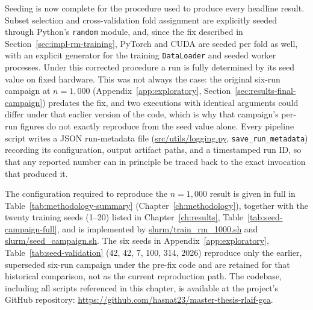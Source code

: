Seeding is now complete for the procedure used to produce every headline
result. Subset selection and cross-validation fold assignment are explicitly
seeded through Python's \texttt{random} module, and, since the fix described
in Section~\ref{sec:impl-rm-training}, PyTorch and CUDA are seeded per fold as
well, with an explicit generator for the training \texttt{DataLoader} and
seeded worker processes. Under this corrected procedure a run is fully
determined by its seed value on fixed hardware. This was not always the case:
the original six-run campaign at $n=1{,}000$
(Appendix~\ref{app:exploratory}, Section~\ref{sec:results-final-campaign}) predates
the fix, and two executions with identical arguments could differ under that
earlier version of the code, which is why that campaign's per-run figures do
not exactly reproduce from the seed value alone. Every pipeline script writes
a JSON run-metadata file
(\url{src/utils/logging.py}, \texttt{save\_run\_metadata}) recording its
configuration, output artifact paths, and a timestamped run ID, so that any
reported number can in principle be traced back to the exact invocation that
produced it.

The configuration required to reproduce the $n=1{,}000$ result is given in full
in Table~\ref{tab:methodology-summary} (Chapter~\ref{ch:methodology}), together
with the twenty training seeds (1--20) listed in Chapter~\ref{ch:results},
Table~\ref{tab:seed-campaign-full}, and is implemented by
\url{slurm/train_rm_1000.sh} and \url{slurm/seed_campaign.sh}. The six seeds
in Appendix~\ref{app:exploratory}, Table~\ref{tab:seed-validation}
(42, 42, 7, 100, 314, 2026) reproduce only
the earlier, superseded six-run campaign under the pre-fix code and are
retained for that historical comparison, not as the current reproduction
path. The codebase, including all scripts referenced in this chapter, is
available at the project's GitHub repository:
\url{https://github.com/hasnat23/master-thesis-rlaif-gca}.
